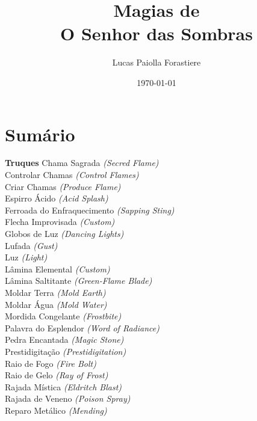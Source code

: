 \documentclass{RPG_Adventure}[2021/10/20]
\title{Magias de\\ \Huge{O Senhor das Sombras}}
\date{\today}
\author{Lucas Paiolla Forastiere}
\begin{document}
\maketitle

\chapter{Sumário}\n\n\noindent\textbf{Truques}
{\normalsize Chama Sagrada \textit{(Secred Flame)}\\ }
{\normalsize Controlar Chamas \textit{(Control Flames)}\\ }
{\normalsize Criar Chamas \textit{(Produce Flame)}\\ }
{\normalsize Espirro Ácido \textit{(Acid Splash)}\\ }
{\normalsize Ferroada do Enfraquecimento \textit{(Sapping Sting)}\\ }
{\normalsize Flecha Improvisada \textit{(Custom)}\\ }
{\normalsize Globos de Luz \textit{(Dancing Lights)}\\ }
{\normalsize Lufada \textit{(Gust)}\\ }
{\normalsize Luz \textit{(Light)}\\ }
{\normalsize Lâmina Elemental \textit{(Custom)}\\ }
{\normalsize Lâmina Saltitante \textit{(Green-Flame Blade)}\\ }
{\normalsize Moldar Terra \textit{(Mold Earth)}\\ }
{\normalsize Moldar Água \textit{(Mold Water)}\\ }
{\normalsize Mordida Congelante \textit{(Frostbite)}\\ }
{\normalsize Palavra do Esplendor \textit{(Word of Radiance)}\\ }
{\normalsize Pedra Encantada \textit{(Magic Stone)}\\ }
{\normalsize Prestidigitação \textit{(Prestidigitation)}\\ }
{\normalsize Raio de Fogo \textit{(Fire Bolt)}\\ }
{\normalsize Raio de Gelo \textit{(Ray of Frost)}\\ }
{\normalsize Rajada Mística \textit{(Eldritch Blast)}\\ }
{\normalsize Rajada de Veneno \textit{(Poison Spray)}\\ }
{\normalsize Reparo Metálico \textit{(Mending)}\\ }
\end{document}
